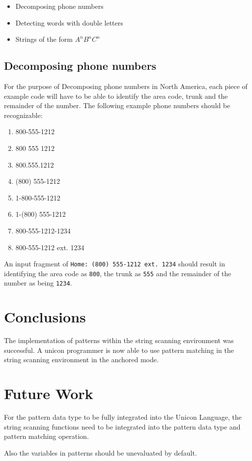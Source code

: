 \documentclass{article}
\begin{document}
\begin{itemize}
\item Decomposing phone numbers
\item Detecting words with double letters
\item Strings of the form \emph{$A^nB^nC^n$}
\end{itemize}

\subsection{Decomposing phone numbers}
For the purpose of Decomposing phone numbers in North America, each piece of example code will have to be able to identify the area code, trunk and the remainder of the number.  The following example phone numbers should be recognizable:

\begin{enumerate}
\item 800-555-1212
\item 800 555 1212
\item 800.555.1212
\item (800) 555-1212
\item 1-800-555-1212
\item 1-(800) 555-1212
\item 800-555-1212-1234
\item 800-555-1212 ext. 1234
\end{enumerate}

An input fragment of \texttt{Home: (800) 555-1212 ext. 1234} should result in identifying the area code as \texttt{800}, the trunk as \texttt{555} and the remainder of the number as being \texttt{1234}.

\section{Conclusions}
The implementation of patterns within the string scanning environment was successful.  A unicon programmer is now able to use pattern matching in the string scanning environment in the anchored mode.

\section{Future Work}
For the pattern data type to be fully integrated into the Unicon Language, the string scanning functions need to be integrated into the pattern data type and pattern matching operation.  

Also the variables in patterns should be unevaluated by default.

\pagebreak


\end{document}
